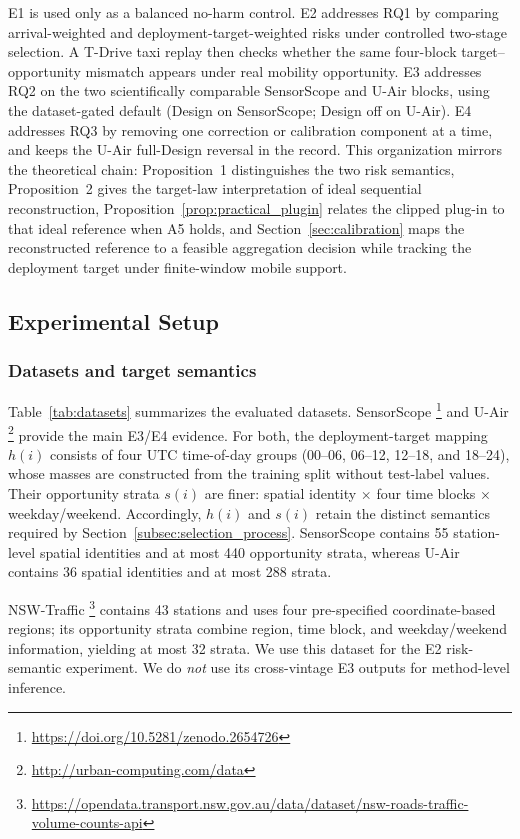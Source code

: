 \documentclass[letterpaper,journal]{IEEEtran}
\begin{document}
E1 is used only as a balanced no-harm control.  E2 addresses RQ1 by comparing
arrival-weighted and deployment-target-weighted risks under controlled
two-stage selection.  A T-Drive taxi replay then checks whether the same
four-block target--opportunity mismatch appears under real mobility
opportunity.  E3 addresses RQ2 on the two scientifically comparable
SensorScope and U-Air blocks, using the dataset-gated default
(Design on SensorScope; Design off on U-Air).  E4 addresses RQ3 by
removing one correction or calibration component at a time, and keeps
the U-Air full-Design reversal in the record.  This organization mirrors the
theoretical chain: Proposition~1 distinguishes the two risk semantics,
Proposition~2 gives the target-law interpretation of ideal sequential
reconstruction, Proposition~\ref{prop:practical_plugin} relates the
clipped plug-in to that ideal reference when A5 holds, and
Section~\ref{sec:calibration} maps the reconstructed reference to a feasible
aggregation decision while tracking the deployment target under finite-window
mobile support.

\subsection{Experimental Setup}
\label{subsec:eval_setup}

\subsubsection{Datasets and target semantics}

Table~\ref{tab:datasets} summarizes the evaluated datasets.  SensorScope
\cite{ingelrest2010sensorscope,barrenetxea2019sensorscope}\footnote{\url{https://doi.org/10.5281/zenodo.2654726}}
and U-Air
\cite{zheng2013uair}\footnote{\url{http://urban-computing.com/data}}
provide the main E3/E4 evidence.  For both, the deployment-target mapping
$h(i)$ consists of four UTC time-of-day groups
(00--06, 06--12, 12--18, and 18--24), whose masses are constructed from the training
split without test-label values.  Their opportunity strata $s(i)$ are finer:
spatial identity $\times$ four time blocks $\times$ weekday/weekend.
Accordingly, $h(i)$ and $s(i)$ retain the distinct semantics required by
Section~\ref{subsec:selection_process}.  SensorScope contains 55 station-level
spatial identities and at most 440 opportunity strata, whereas U-Air contains
36 spatial identities and at most 288 strata.

NSW-Traffic
\cite{tfnsw2024traffic}\footnote{\url{https://opendata.transport.nsw.gov.au/data/dataset/nsw-roads-traffic-volume-counts-api}}
contains 43 stations and uses four pre-specified coordinate-based regions;
its opportunity strata combine region, time block, and weekday/weekend
information, yielding at most 32 strata.  We use this dataset for the E2
risk-semantic experiment.  We do \emph{not} use its cross-vintage E3 outputs for
method-level inference.
\end{document}
